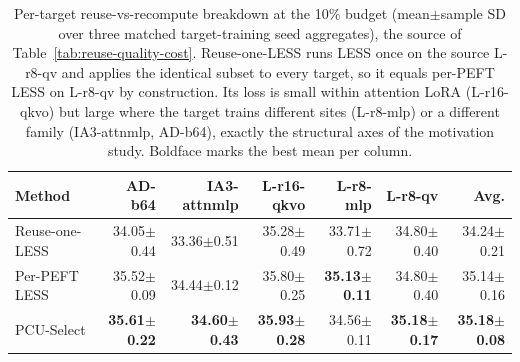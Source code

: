 \begin{table}[t]
\centering
\small
\setlength{\tabcolsep}{5pt}
\caption{Per-target reuse-vs-recompute breakdown at the 10\% budget (mean$\pm$sample SD over three matched target-training seed aggregates), the source of Table~\ref{tab:reuse-quality-cost}. Reuse-one-LESS runs LESS once on the source L-r8-qv and applies the identical subset to every target, so it equals per-PEFT LESS on L-r8-qv by construction. Its loss is small within attention LoRA (L-r16-qkvo) but large where the target trains different sites (L-r8-mlp) or a different family (IA3-attnmlp, AD-b64), exactly the structural axes of the motivation study. Boldface marks the best mean per column.}
\label{tab:reuse-breakdown}
\begin{tabular}{lrrrrrr}
\toprule
Method & AD-b64 & IA3-attnmlp & L-r16-qkvo & L-r8-mlp & L-r8-qv & Avg. \\
\midrule
Reuse-one-LESS & 34.05{\scriptsize$\pm$0.44} & 33.36{\scriptsize$\pm$0.51} & 35.28{\scriptsize$\pm$0.49} & 33.71{\scriptsize$\pm$0.72} & 34.80{\scriptsize$\pm$0.40} & 34.24{\scriptsize$\pm$0.21} \\
Per-PEFT LESS & 35.52{\scriptsize$\pm$0.09} & 34.44{\scriptsize$\pm$0.12} & 35.80{\scriptsize$\pm$0.25} & \textbf{35.13{\scriptsize$\pm$0.11}} & 34.80{\scriptsize$\pm$0.40} & 35.14{\scriptsize$\pm$0.16} \\
PCU-Select & \textbf{35.61{\scriptsize$\pm$0.22}} & \textbf{34.60{\scriptsize$\pm$0.43}} & \textbf{35.93{\scriptsize$\pm$0.28}} & 34.56{\scriptsize$\pm$0.11} & \textbf{35.18{\scriptsize$\pm$0.17}} & \textbf{35.18{\scriptsize$\pm$0.08}} \\
\bottomrule
\end{tabular}
\end{table}
